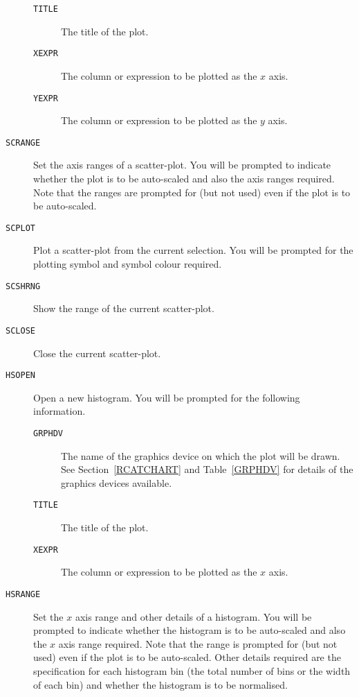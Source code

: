 \documentclass[twoside,11pt]{starlink}
\begin{document}
\begin{description}
\begin{description}
    \item[ \texttt{TITLE} ] The title of the plot.

    \item[ \texttt{XEXPR} ] The column or expression to be plotted as
     the $x$\/ axis.

    \item[ \texttt{YEXPR} ] The column or expression to be plotted as
     the $y$\/ axis.

  \end{description}

  \item[ \texttt{SCRANGE} ] Set the axis ranges of a scatter-plot.
   You will be prompted to indicate whether the plot is to be
   auto-scaled and also the axis ranges required.  Note that the
   ranges are prompted for (but not used) even if the plot is to be
   auto-scaled.

  \item[ \texttt{SCPLOT} ] Plot a scatter-plot from the current selection.
   You will be prompted for the plotting symbol and symbol colour
   required.

  \item[ \texttt{SCSHRNG} ] Show the range of the current scatter-plot.

  \item[ \texttt{SCLOSE} ] Close the current scatter-plot.

  \item[ \texttt{HSOPEN} ] Open a new histogram.  You will be prompted
   for the following information.

  \begin{description}

    \item[ \texttt{GRPHDV} ] The name of the graphics device on which
     the plot will be drawn.  See Section~\ref{RCATCHART} and
     Table~\ref{GRPHDV} for details of the graphics devices available.

    \item[ \texttt{TITLE} ] The title of the plot.

    \item[ \texttt{XEXPR} ] The column or expression to be plotted as
     the $x$\/ axis.

  \end{description}

  \item[ \texttt{HSRANGE} ] Set the $x$\/ axis range and other details
   of a histogram.  You will be prompted to indicate whether the histogram
   is to be auto-scaled and also the $x$\/ axis range required.  Note that
   the range is prompted for (but not used) even if the plot is to be
   auto-scaled.  Other details required are the specification for each
   histogram bin (the total number of bins or the width of each bin)
   and whether the histogram is to be normalised.


\end{description}
\end{document}

